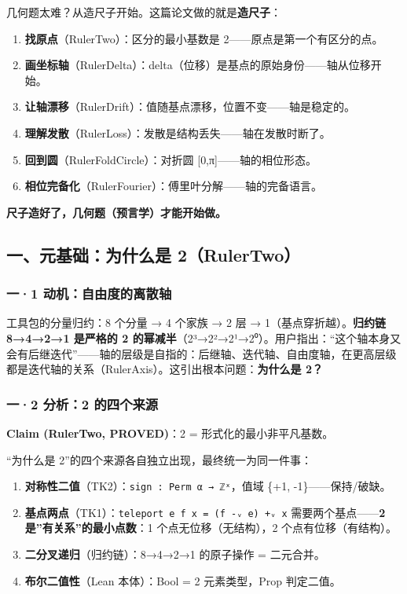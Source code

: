 \documentclass[
]{article}
\providecommand{\tightlist}{%
  \setlength{\itemsep}{0pt}\setlength{\parskip}{0pt}}
\begin{document}
几何题太难？从造尺子开始。这篇论文做的就是\textbf{造尺子}：

\begin{enumerate}
\def\labelenumi{\arabic{enumi}.}
\tightlist
\item
  \textbf{找原点}（RulerTwo）：区分的最小基数是
  2------原点是第一个有区分的点。
\item
  \textbf{画坐标轴}（RulerDelta）：delta（位移）是基点的原始身份------轴从位移开始。
\item
  \textbf{让轴漂移}（RulerDrift）：值随基点漂移，位置不变------轴是稳定的。
\item
  \textbf{理解发散}（RulerLoss）：发散是结构丢失------轴在发散时断了。
\item
  \textbf{回到圆}（RulerFoldCircle）：对折圆
  {[}0,π{]}------轴的相位形态。
\item
  \textbf{相位完备化}（RulerFourier）：傅里叶分解------轴的完备语言。
\end{enumerate}

\textbf{尺子造好了，几何题（预言学）才能开始做。}

\subsection{一、元基础：为什么是
2（RulerTwo）}\label{ux4e00ux5143ux57faux7840ux4e3aux4ec0ux4e48ux662f-2rulertwo}

\subsubsection{一·1
动机：自由度的离散轴}\label{ux4e001-ux52a8ux673aux81eaux7531ux5ea6ux7684ux79bbux6563ux8f74}

工具包的分量归约：8 个分量 → 4 个家族 → 2 层 →
1（基点穿折越）。\textbf{归约链 8→4→2→1 是严格的 2
的幂减半}（2³→2²→2¹→2⁰）。用户指出：``这个轴本身又会有后继迭代''------轴的层级是自指的：后继轴、迭代轴、自由度轴，在更高层级都是迭代轴的关系（RulerAxis）。这引出根本问题：\textbf{为什么是
2？}

\subsubsection{一·2 分析：2
的四个来源}\label{ux4e002-ux5206ux67902-ux7684ux56dbux4e2aux6765ux6e90}

\textbf{Claim (RulerTwo, PROVED)}：2 = 形式化的最小非平凡基数。

``为什么是 2''的四个来源各自独立出现，最终统一为同一件事：

\begin{enumerate}
\def\labelenumi{\arabic{enumi}.}
\tightlist
\item
  \textbf{对称性二值}（TK2）：\texttt{sign\ :\ Perm\ α\ →\ ℤˣ}，值域
  \{+1, -1\}------保持/破缺。
\item
  \textbf{基点两点}（TK1）：\texttt{teleport\ e\ f\ x\ =\ (f\ -ᵥ\ e)\ +ᵥ\ x}
  需要两个基点------\textbf{2 是''有关系''的最小点数}：1
  个点无位移（无结构），2 个点有位移（有结构）。
\item
  \textbf{二分叉递归}（归约链）：8→4→2→1 的原子操作 = 二元合并。
\item
  \textbf{布尔二值性}（Lean 本体）：Bool = 2 元素类型，Prop 判定二值。
\end{enumerate}
\end{document}
